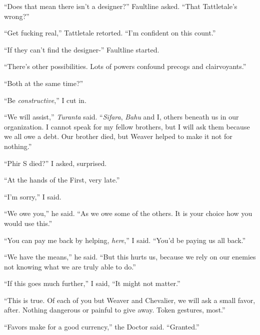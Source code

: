 ``Does that mean there isn't a designer?'' Faultline asked.  ``That Tattletale's wrong?''



``Get fucking real,'' Tattletale retorted.  ``I'm confident on this count.''



``If they can't find the designer-'' Faultline started.



``There's other possibilities.  Lots of powers confound precogs and clairvoyants.''



``Both at the same time?''



``Be \emph{constructive},'' I cut in.



``We will assist,'' \emph{Turanta} said.  ``\emph{Sifara}, \emph{Bahu} and I, others beneath us in our organization.  I cannot speak for my fellow brothers, but I will ask them because we all owe a debt.  Our brother died, but Weaver helped to make it not for nothing.''



``Phir S died?'' I asked, surprised.



``At the hands of the First, very late.''



``I'm sorry,'' I said.



``We owe you,'' he said.  ``As we owe some of the others.  It is your choice how you would use this.''



``You can pay me back by helping,\emph{ }\emph{here},'' I said.  ``You'd be paying us all back.''



``We have the means,'' he said. ``But this hurts us, because we rely on our enemies not knowing what we are truly able to do.''



``If this goes much further,'' I said, ``It might not matter.''



``This is true.  Of each of you but Weaver and Chevalier, we will ask a small favor, after.  Nothing dangerous or painful to give away.  Token gestures, most.''



``Favors make for a good currency,'' the Doctor said.  ``Granted.''



